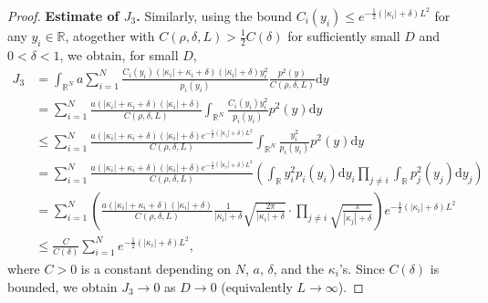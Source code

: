 \documentclass[12pt,reqno]{amsart}
\numberwithin{equation}{section}
\begin{document}
\begin{proof}
\textbf{Estimate of $J_3$.} 
Similarly, using the bound $C_i(y_i)\le e^{-\frac12 (|\kappa_i|+\delta)L^2 }$  for any $y_i\in\mathbb{R}$, atogether with $C(\rho,\delta,L)>\frac12 C(\delta)$ for sufficiently small $D$ and $0<\delta<1$, we obtain, for small $D$,
\begin{align}
    J_3&=\int_{\mathbb{R}^N}
a\sum_{i=1}^N
\frac{ C_i(y_i) (|\kappa_i| + \kappa_i + \delta)(|\kappa_i|+\delta)y_i^2}{p_i(y_i)}
\frac{p^2(y)}{C(\rho,\delta,L)}\mathrm{d}y\nonumber\\
&=\sum_{i=1}^N\frac{a(|\kappa_i| + \kappa_i + \delta)(|\kappa_i|+\delta)}{C(\rho,\delta,L)}\int_{\mathbb{R}^N}
\frac{ C_i(y_i) y_i^2}{p_i(y_i)}
 p^2(y)
 \mathrm{d}y\nonumber\\
 &\le\sum_{i=1}^N\frac{a(|\kappa_i| + \kappa_i + \delta)(|\kappa_i|+\delta)e^{-\frac12 (|\kappa_i|+\delta)L^2 }}{C(\rho,\delta,L)}\int_{\mathbb{R}^N}
\frac{ y_i^2}{p_i(y_i)}
 p^2(y)
 \mathrm{d}y\nonumber\\
 &=\sum_{i=1}^N\frac{a(|\kappa_i| + \kappa_i + \delta)(|\kappa_i|+\delta)e^{-\frac12 (|\kappa_i|+\delta)L^2 }}{C(\rho,\delta,L)}\left(\int_{\mathbb{R}} y_i^2 p_i(y_i)\mathrm{d}y_i
\prod_{j\neq i}\int_{\mathbb{R}} p_j^2(y_j) \mathrm{d}y_j\right)\nonumber\\
& =\sum_{i=1}^N\left(
\frac{a (|\kappa_i|+\kappa_i+\delta)(|\kappa_i|+\delta) }{C(\rho,\delta,L)}
\frac{1}{|\kappa_i|+\delta}\sqrt{\frac{2\pi}{|\kappa_i|+\delta}}\cdot\prod_{j\neq i}\sqrt{\frac{\pi}{|\kappa_j|+\delta}} \right)
e^{-\frac{1}{2}(|\kappa_i|+\delta)L^2}\nonumber\\
& \leq
\frac{C}{C(\delta)}\sum_{i=1}^N
e^{-\frac{1}{2}(|\kappa_i|+\delta)L^2},
\end{align}
where $C>0$ is a constant depending on $N$, $a$, $\delta$, and the $\kappa_i$'s. Since $C(\delta)$ is bounded, we obtain $J_3 \longrightarrow 0$ as $D\to0$ (equivalently $L\to\infty$).




\end{proof}
\end{document}
